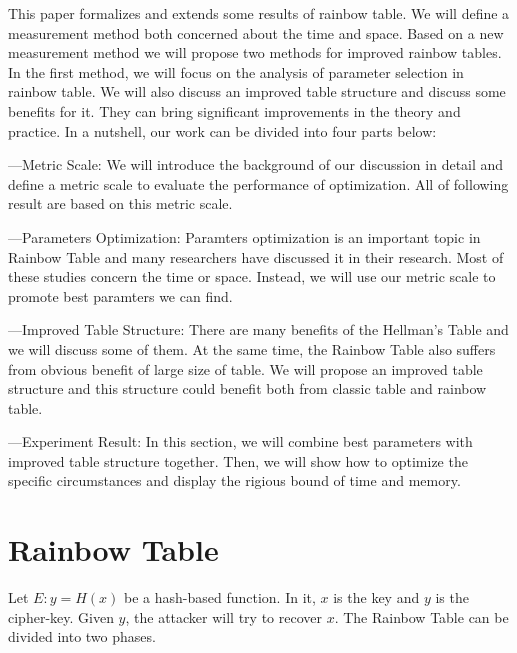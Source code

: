 \documentclass[runningheads,a4paper]{llncs}
\begin{document}
This paper formalizes and extends some results of rainbow table. We will define a measurement method both concerned about the time and space. Based on a new measurement method we will propose two methods for improved rainbow tables. In the first method, we will focus on the analysis of parameter selection in rainbow table. We will also discuss an improved table structure and discuss some benefits for it. They can bring significant improvements in the theory and practice. In a nutshell, our work can be divided into four parts below:

---Metric Scale:  We will introduce the background of our discussion in detail and define a metric scale to evaluate the performance of optimization. All of following result are based on this metric scale. 

---Parameters Optimization: Paramters optimization is an important topic in Rainbow Table and many researchers \cite{saran2009choosing} \cite{kusuda1996optimization} \cite{il1999achieving} have discussed it in their research. Most of these studies concern the time or space. Instead, we will use our metric scale to promote best paramters we can find.

---Improved Table Structure: There are many benefits of the Hellman's Table  and we will discuss some of them. At the same time, the Rainbow Table also suffers from obvious benefit of large size of table. We will propose an improved table structure and this structure could benefit both from classic table and rainbow table. 

---Experiment Result: In this section, we will combine best parameters with improved table structure together. Then, we will show how to optimize the specific circumstances and display the rigious bound of time and memory.

\section{Rainbow Table}
Let $E : y = H(x)$ be a hash-based \cite{rogaway2004cryptographic} function. In it, $x$ is the key and $y$ is the cipher-key. Given $y$, the attacker will try to recover $x$. The Rainbow Table can be divided into two phases.
\end{document}
